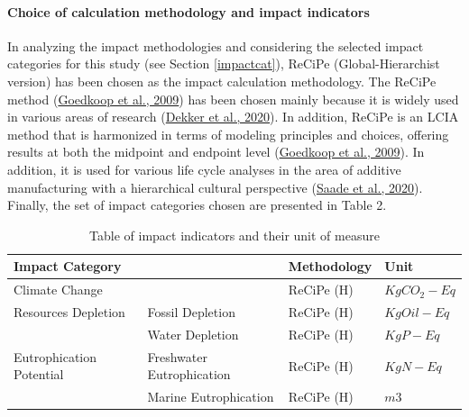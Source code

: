 \documentclass[12pt]{elsarticle} %
\begin{document}
\hypertarget{choice-of-calculation-methodology-and-impact-indicators}{%
\paragraph{Choice of calculation methodology and impact indicators}\label{choice-of-calculation-methodology-and-impact-indicators}}

In analyzing the impact methodologies and considering the selected impact categories for this study (see Section \ref{impactcat}), ReCiPe (Global-Hierarchist version) has been chosen as the impact calculation methodology.
The ReCiPe method (\protect\hyperlink{ref-goedkoop2009}{Goedkoop et al., 2009}) has been chosen mainly because it is widely used in various areas of research (\protect\hyperlink{ref-dekker2020}{Dekker et al., 2020}).
In addition, ReCiPe is an LCIA method that is harmonized in terms of modeling principles and choices, offering results at both the midpoint and endpoint level (\protect\hyperlink{ref-goedkoop2009}{Goedkoop et al., 2009}).
In addition, it is used for various life cycle analyses in the area of additive manufacturing with a hierarchical cultural perspective (\protect\hyperlink{ref-Saade2020}{Saade et al., 2020}).
Finally, the set of impact categories chosen are presented in Table 2.

\begin{footnotesize}
\begin{table}
\caption{ Table of impact indicators and their unit of measure}
\label{table2}
\centering
\begin{tabu} to 0.95\linewidth {X[0.5,l]  X[0.5,l] | X[1,l] | X[0.5,l]}
\toprule
\textbf{Impact Category} & & \textbf{Methodology} & \textbf{Unit} \\
\midrule 

 Climate Change  & &    ReCiPe (H) &    $Kg CO_{2} -  Eq$ \\ \midrule

Resources Depletion & Fossil Depletion &    ReCiPe (H) &    $Kg Oil - Eq$ \\

&   Water Depletion &  ReCiPe (H) & $Kg P - Eq$ \\ \midrule

Eutrophication Potential &  Freshwater Eutrophication & ReCiPe (H) &    $Kg N - Eq$ \\
    & Marine Eutrophication &  ReCiPe (H)  &    $m3$ \\

\bottomrule 
\end{tabu}
\end{table}
\end{footnotesize}
\end{document}
